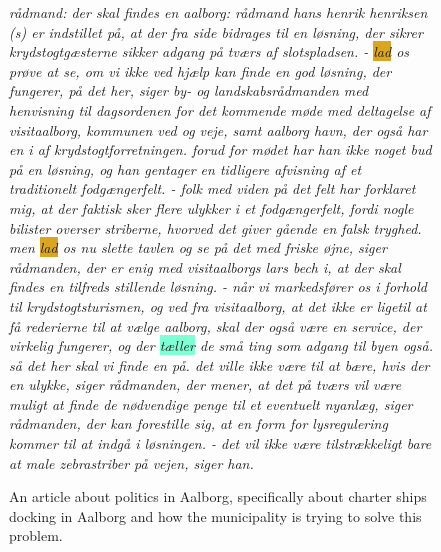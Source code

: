 \begin{figure}
	\begin{tcolorbox}
		\emph{
			rådmand: der skal \colorbox{Peach}{findes}  en  aalborg: rådmand \colorbox{Peach}{hans} \colorbox{Peach}{henrik} \colorbox{Peach}{henriksen} (s) er indstillet på, at der fra  side bidrages til en løsning, der sikrer krydstogtgæsterne sikker adgang på tværs af slotspladsen. - \colorbox{Goldenrod}{lad} os prøve at se, om vi ikke ved  \colorbox{Peach}{hjælp} kan \colorbox{Peach}{finde} en god løsning, der fungerer, på det her, siger by- og landskabsrådmanden med henvisning til dagsordenen for det \colorbox{Peach}{kommende} \colorbox{Peach}{møde} med deltagelse af visitaalborg, \colorbox{Peach}{kommunen} ved  og veje,  \colorbox{Peach}{samt} aalborg havn, der også har en  i  af krydstogtforretningen. forud for mødet har han ikke noget bud på en løsning, og han gentager en tidligere afvisning af et traditionelt fodgængerfelt. - \colorbox{Peach}{folk} med viden på det felt har forklaret mig, at der \colorbox{Peach}{faktisk} \colorbox{Peach}{sker} flere ulykker i et fodgængerfelt, fordi nogle bilister overser striberne, hvorved det \colorbox{Peach}{giver} gående en falsk tryghed. men \colorbox{Goldenrod}{lad} os nu slette tavlen og se på det med friske øjne, siger rådmanden, der er enig med visitaalborgs \colorbox{Peach}{lars} bech i, at der skal \colorbox{Peach}{findes} en tilfreds stillende løsning. - når vi markedsfører os i \colorbox{Peach}{forhold} til krydstogtsturismen, og ved fra visitaalborg, at det ikke er ligetil at få rederierne til at vælge aalborg, skal der også være en service, der virkelig fungerer, og der \colorbox{Aquamarine}{tæller} de små \colorbox{Peach}{ting} som adgang til \colorbox{Peach}{byen} også. så det her skal vi \colorbox{Peach}{finde} en  på. det ville ikke være til at bære, hvis der  en ulykke, siger rådmanden, der mener, at det på tværs vil være \colorbox{Peach}{muligt} at \colorbox{Peach}{finde} de nødvendige \colorbox{Peach}{penge} til et eventuelt nyanlæg, siger rådmanden, der kan forestille sig, at en \colorbox{Peach}{form} for lysregulering kommer til at indgå i løsningen. - det vil ikke være tilstrækkeligt bare at male zebrastriber på vejen, siger han.
		}
	\end{tcolorbox}
	\caption{An article about politics in Aalborg, specifically about charter ships docking in Aalborg and how the municipality is trying to solve this problem.}
	\label{art:2}
\end{figure}
 
